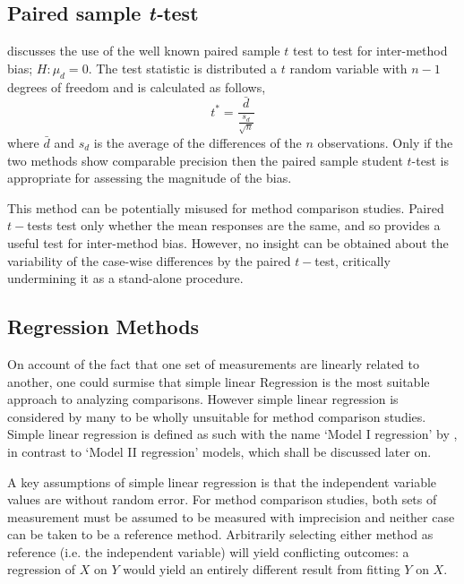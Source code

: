 \documentclass[12pt, a4paper]{report}
\theoremstyle{plain}
\theoremstyle{definition}
\theoremstyle{remark}
\begin{document}
	
	\subsection*{Paired sample \emph{t-}test}
	\citet{Bartko} discusses the use of the well known paired sample $t$ test to test for inter-method bias; $H: \mu_{d}=0$. The test
	statistic is distributed a $t$ random variable with $n-1$ degrees of freedom and is calculated as follows,
	\begin{equation}
	t^{*} = \frac{\bar{d}}{ \frac{s_{d}}{\sqrt{n}}}
	\end{equation}
	where $\bar{d}$ and $s_{d}$ is the average of the differences of the $n$ observations. Only if the two methods show comparable
	precision then the paired sample student $t$-test is appropriate for assessing the magnitude of the bias.
	
	This method can be potentially misused for method comparison studies. Paired $t-$tests test only whether the mean responses are the same, and so provides a useful test for inter-method bias. However, no insight can be obtained about the variability of the case-wise differences by the paired $t-$test, critically undermining it as a stand-alone procedure.

	

	\subsection*{Regression Methods}
		On account of the fact that one set of measurements are linearly related to another, one could surmise that simple linear Regression is the most suitable approach to analyzing comparisons. However simple linear regression  is considered by many \citet{BA83,CornCoch,ludbrook97} to be wholly unsuitable for method comparison studies. Simple linear regression is defined as such with the name `Model I regression' by \citet{CornCoch}, in contrast to `Model II regression' models, which shall be discussed later on.
		
		A key assumptions of simple linear regression is that the independent variable values are without random error. 	
		For method comparison studies, both sets of measurement must be assumed to be measured with imprecision and neither case can be taken to be a reference method. Arbitrarily
		selecting either method as reference (i.e. the independent variable) will yield conflicting outcomes: a regression of $X$ on $Y$ would yield an entirely different result from fitting $Y$ on $X$.
	
\end{document}
